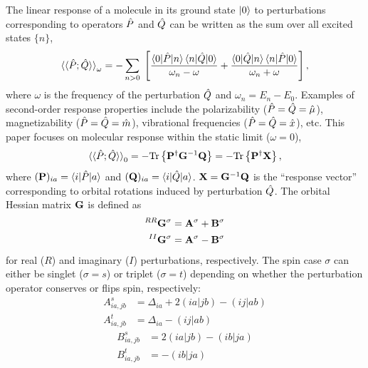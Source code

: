 \documentclass[%
  class = book,%
  crop = false,%
  float = true,%
  multi = true,%
  preview = false,%
]{standalone}
\begin{document}
The linear response of a molecule in its ground state \(\ket{0}\) to perturbations corresponding to operators \(\hat{P}\) and \(\hat{Q}\) can be written as the sum over all excited states \(\{n\}\),
\begin{equation}
  \braket{\braket{\hat{P}; \hat{Q}}}_{\omega}
  =
  - \sum_{n > 0} \;
    \left[
      \frac{\braket{0|\hat{P}|n} \braket{n|\hat{Q}|0}}{\omega_{n} - \omega}
    + \frac{\braket{0|\hat{Q}|n} \braket{n|\hat{P}|0}}{\omega_{n} + \omega}
    \right],
\end{equation}
where \(\omega\) is the frequency of the perturbation \(\hat{Q}\) and \(\omega_{n} = E_{n} - E_{0}\). Examples of second-order response properties include the polarizability (\(\hat{P} = \hat{Q} = \hat{\mu}\)), magnetizability (\(\hat{P} = \hat{Q} = \hat{m}\)), vibrational frequencies (\(\hat{P} = \hat{Q} = \hat{x}\)), etc. This paper focuses on molecular response within the static limit (\(\omega = 0\)),
\begin{equation}
  \braket{\braket{\hat{P}; \hat{Q}}}_{0}
  =
  - {\mathrm{Tr}}\left\{\mathbf{P}^{\dagger} \mathbf{G}^{-1} \mathbf{Q}\right\}
  =
  - {\mathrm{Tr}}\left\{\mathbf{P}^{\dagger} \mathbf{X}\right\},
\end{equation}
where \((\mathbf{P})_{ia} = \braket{i|\hat{P}|a}\) and \((\mathbf{Q})_{ia} = \braket{i|\hat{Q}|a}\). \(\mathbf{X} = \mathbf{G}^{-1} \mathbf{Q}\) is the ``response vector'' corresponding to orbital rotations induced by perturbation \(\hat{Q}\). The orbital Hessian matrix \(\mathbf{G}\) is defined as
\begin{equation}
  \begin{aligned}
    ^{RR}\mathbf{G}^{\sigma} &= \mathbf{A}^{\sigma} + \mathbf{B}^{\sigma} \\
    ^{II}\mathbf{G}^{\sigma} &= \mathbf{A}^{\sigma} - \mathbf{B}^{\sigma}
  \end{aligned}
\end{equation}
for real (\(R\)) and imaginary (\(I\)) perturbations, respectively\cite{doi:10.1080/00268976.2015.1024182}. The spin case \(\sigma\) can either be singlet (\(\sigma = s\)) or triplet (\(\sigma = t\)) depending on whether the perturbation operator conserves or flips spin, respectively:
\begin{equation}
  \label{eq:orbital-hessian-a}
  \begin{aligned}
    A^{s}_{ia,jb} &= \Delta_{ia} + 2(ia|jb) - (ij|ab) \\
    A^{t}_{ia,jb} &= \Delta_{ia} - (ij|ab)
  \end{aligned}
\end{equation}
\begin{equation}
  \label{eq:orbital-hessian-b}
  \begin{aligned}
    B^{s}_{ia,jb} &= 2(ia|jb) - (ib|ja) \\
    B^{t}_{ia,jb} &= - (ib|ja)
  \end{aligned}
\end{equation}
\end{document}
